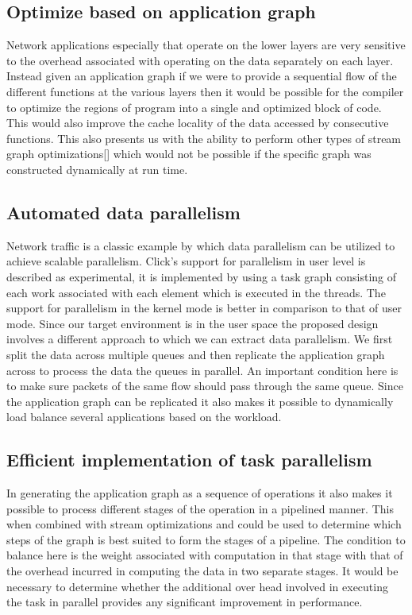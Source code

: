 \documentclass[conference]{IEEEtran}
\begin{document}
\subsection{Optimize based on application graph}

Network applications especially that operate on the lower layers are very sensitive to the overhead associated with operating on the data separately on each layer. Instead given an application graph if we were to provide a sequential flow of the different functions at the various layers then it would be possible for the compiler to optimize the regions of program into a single and optimized block of code. This would also improve the cache locality of the data accessed by consecutive functions. This also presents us with the ability to perform other types of stream graph optimizations[] which would not be possible if the specific graph was constructed dynamically at run time.

\subsection{Automated data parallelism}

Network traffic is a classic example by which data parallelism can be utilized to achieve scalable parallelism. Click's support for parallelism in user level is described as experimental, it is implemented by using a task graph consisting of each work associated with each element which is executed in the threads. The support for parallelism in the kernel mode is better in comparison to that of user mode. Since our target environment is in the user space the proposed design involves a different approach to which we can extract data parallelism. We first split the data across multiple queues and then replicate the application graph across to process the data the queues in parallel. An important condition here is to make sure packets of the same flow should pass through the same queue. Since the application graph can be replicated it also makes it possible to dynamically load balance several applications based on the workload.   

\subsection{Efficient implementation of task parallelism}

In generating the application graph as a sequence of operations it also makes it possible to process different stages of the operation in a pipelined manner. This when combined with stream optimizations and could be used to determine which steps of the graph is best suited to form the stages of a pipeline. The condition to balance here is the weight associated with computation in that stage with that of the overhead incurred in computing the data in two separate stages. It would be necessary to determine whether the additional over head involved in executing the task in parallel provides any significant improvement in performance. 
\end{document}
